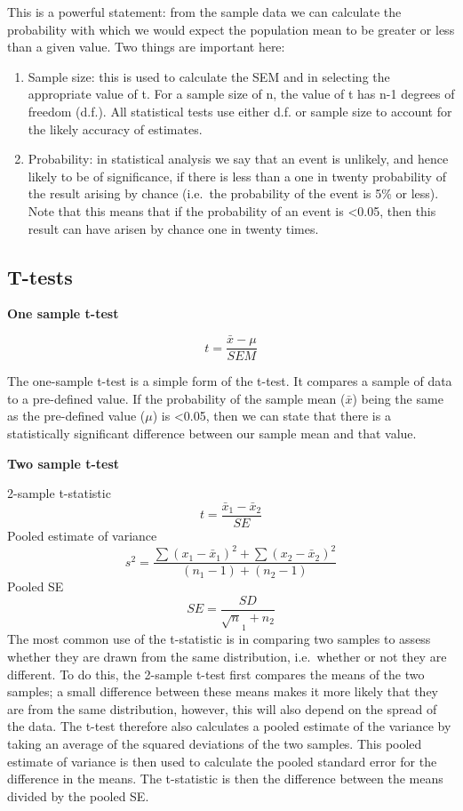 \documentclass[
]{book}
\begin{document}
This is a powerful statement: from the sample data we can calculate the probability with which we would expect the population mean to be greater or less than a given value. Two things are important here:

\begin{enumerate}
\def\labelenumi{\arabic{enumi})}
\item
  Sample size: this is used to calculate the SEM and in selecting the appropriate value of t. For a sample size of n, the value of t has n-1 degrees of freedom (d.f.). All statistical tests use either d.f. or sample size to account for the likely accuracy of estimates.
\item
  Probability: in statistical analysis we say that an event is unlikely, and hence likely to be of significance, if there is less than a one in twenty probability of the result arising by chance (i.e.~the probability of the event is 5\% or less). Note that this means that if the probability of an event is \textless0.05, then this result can have arisen by chance one in twenty times.
\end{enumerate}

\hypertarget{t-tests}{%
\subsection*{T-tests}\label{t-tests}}

\textbf{One sample t-test}

\[
t = \frac{\bar x - \mu}{SEM}
\]

The one-sample t-test is a simple form of the t-test. It compares a sample of data to a pre-defined value. If the probability of the sample mean (\(\bar{x}\)) being the same as the pre-defined value (\(\mu\)) is \textless0.05, then we can state that there is a statistically significant difference between our sample mean and that value.

\textbf{Two sample t-test}

2-sample t-statistic
\[
t = \frac{\bar x_1 -\bar x_2}{SE}
\]
Pooled estimate of variance
\[
s^2 = \frac{\sum(x_1 - \bar x_1)^2 + \sum(x_2 - \bar x_2)^2}{(n_1 -1)+(n_2 -1)}
\]
Pooled SE
\[
SE = \frac{SD}{\sqrt n_1 +n_2}
\]
The most common use of the t-statistic is in comparing two samples to assess whether they are drawn from the same distribution, i.e.~whether or not they are different. To do this, the 2-sample t-test first compares the means of the two samples; a small difference between these means makes it more likely that they are from the same distribution, however, this will also depend on the spread of the data. The t-test therefore also calculates a pooled estimate of the variance by taking an average of the squared deviations of the two samples. This pooled estimate of variance is then used to calculate the pooled standard error for the difference in the means. The t-statistic is then the difference between the means divided by the pooled SE.
\end{document}

